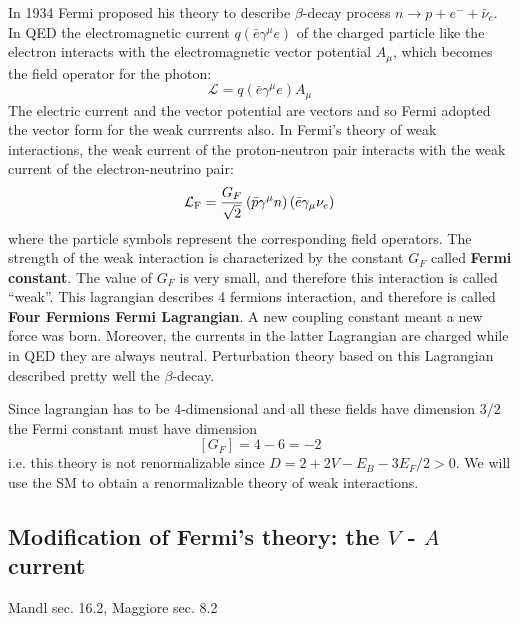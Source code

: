 \documentclass[TheoreticalPhy_ModB.tex]{subfiles}
\begin{document}
In 1934 Fermi proposed his theory to describe $\beta$-decay process $n\to p+e^-+\bar \nu_e$. In QED the electromagnetic current $q(\bar e\gamma^\mu e)$ of the charged particle like the electron interacts with the electromagnetic vector potential $A_\mu$, which becomes the field operator for the photon:
\[\mathcal L=q(\bar e\gamma^\mu e)A_\mu\]
The electric current and the vector potential are vectors and so Fermi adopted the vector form for the weak currrents also. 
In Fermi's theory of weak interactions, the weak current of the proton-neutron pair interacts with the weak current of the electron-neutrino pair:
\[\mathcal L_{\text{F}}=\frac{G_F}{\sqrt 2}\left(\bar p\gamma^\mu n\right)\left(\bar e \gamma_\mu\nu_e\right)\]
where the particle symbols represent the corresponding field operators. The strength of the weak interaction is characterized by the constant $G_F$ called \textbf{Fermi constant}. The value of $G_F$ is very small, and therefore this interaction is called ``weak''. This lagrangian describes 4 fermions interaction, and therefore is called \textbf{Four Fermions Fermi Lagrangian}. A new coupling constant meant a new force was born. Moreover, the currents in the latter Lagrangian are charged while in QED they are always neutral. Perturbation theory based on this Lagrangian described pretty well the $\beta$-decay.

Since lagrangian has to be 4-dimensional and all these fields have dimension $3/2$ the Fermi constant must have dimension
\[[G_F]=4-6=-2\]
i.e. this theory is not renormalizable since $D=2+2V-E_B-3E_F/2>0$. We will use the SM to obtain a renormalizable theory of weak interactions. 

\subsection{Modification of Fermi's theory: the $V$ - $A$ current}
\textsf{Mandl sec. 16.2, Maggiore sec. 8.2}\\
\end{document}
